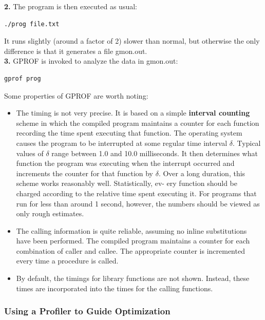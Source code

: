 \documentclass[11pt]{article}
\begin{document}
\textbf{2.} The program is then executed as usual:\\
\begin{verbatim}
./prog file.txt
\end{verbatim}
It runs slightly (around a factor of 2) slower than normal, but otherwise the only difference is that it generates a file gmon.out.\\

\textbf{3.} GPROF is invoked to analyze the data in gmon.out:\\
\begin{verbatim}
gprof prog
\end{verbatim}


Some properties of GPROF are worth noting:\\
\begin{itemize}
\item The timing is not very precise. It is based on a simple \textbf{interval counting} scheme in which the compiled program maintains a counter for each function recording the time spent executing that function. The operating system causes the program to be interrupted at some regular time interval \(\delta\). Typical values of \(\delta\) range between 1.0 and 10.0 milliseconds. It then determines what function the program was executing when the interrupt occurred and increments the counter for that function by \(\delta\). Over a long duration, this scheme works reasonably well. Statistically, ev- ery function should be charged according to the relative time spent executing it. For programs that run for less than around 1 second, however, the numbers should be viewed as only rough estimates.\\
\item The calling information is quite reliable, assuming no inline substitutions have been performed. The compiled program maintains a counter for each combination of caller and callee. The appropriate counter is incremented every time a procedure is called.\\
\item By default, the timings for library functions are not shown. Instead, these times are incorporated into the times for the calling functions.\\
\end{itemize}


\subsubsection{Using a Profiler to Guide Optimization}
\label{sec:orgc0000d3}
\end{document}
